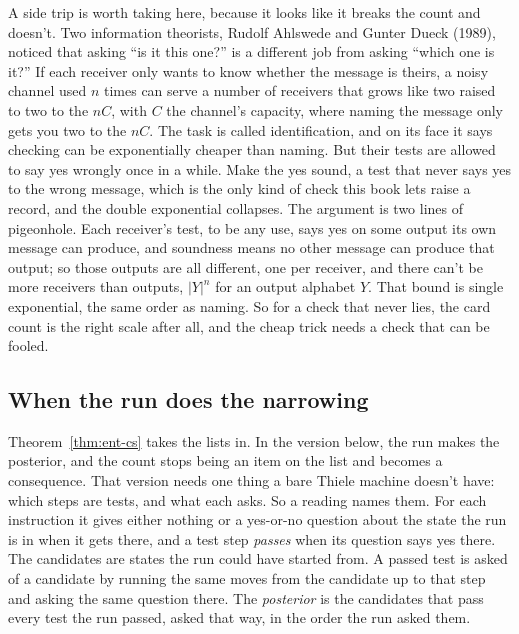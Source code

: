 \documentclass[11pt,twoside]{article}
\theoremstyle{thielethm}
\theoremstyle{thieledef}
\theoremstyle{thieledef}
\theoremstyle{thieledef}
\theoremstyle{thielethm}
\theoremstyle{thieleobs}
\theoremstyle{thielethm}
\begin{document}
A side trip is worth taking here, because it looks like it breaks the count and doesn't. Two
information theorists, Rudolf
Ahlswede and Gunter Dueck (1989), noticed that asking ``is it this one?'' is a different job from
asking ``which one is it?'' If each receiver only wants to know whether the message is theirs, a
noisy channel used $n$ times can serve a number of receivers that grows like two raised to two to
the $nC$, with $C$ the channel's capacity, where naming the message only gets you two to the
$nC$. The task is called identification, and on its face it says checking can be exponentially cheaper than
naming. But their tests are allowed to say yes wrongly once in a while. Make the yes sound, a
test that never says yes to the wrong message, which is the only kind of check this book lets
raise a record, and the double exponential collapses. The argument is two lines of pigeonhole.
Each receiver's test, to be any use, says yes on some
output its own message can produce, and soundness means no other message can produce that output;
so those outputs are all different, one per receiver, and there can't be more receivers than
outputs, $|Y|^n$ for an output alphabet $Y$. That bound is single exponential, the same order as naming. So for a
check that never lies, the card count is the right scale after all, and the cheap trick needs a
check that can be fooled.


\subsection{When the run does the narrowing}

Theorem~\ref{thm:ent-cs} takes the lists in. In the version below, the run makes the posterior, and the count stops being an item on the list and becomes a consequence. That version needs one thing a bare Thiele machine doesn't have: which steps are tests, and what each asks. So a reading names them. For each instruction it gives either nothing or a yes-or-no question about the
state the run is in when it gets there, and a test step \emph{passes} when its question says yes
there. The candidates are states the run could have started from. A passed test is asked of a
candidate by running the same moves from the candidate up to that step and asking the same
question there. The \emph{posterior} is the candidates that pass every test the run passed, asked
that way, in the order the run asked them.
\end{document}
